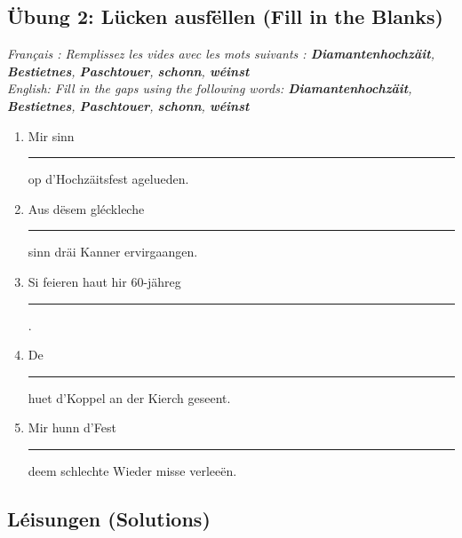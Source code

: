 \subsection*{Übung 2: Lücken ausfëllen (Fill in the Blanks)}
\textit{Français : Remplissez les vides avec les mots suivants : \textbf{Diamantenhochzäit}, \textbf{Bestietnes}, \textbf{Paschtouer}, \textbf{schonn}, \textbf{wéinst}}\\
\textit{English: Fill in the gaps using the following words: \textbf{Diamantenhochzäit}, \textbf{Bestietnes}, \textbf{Paschtouer}, \textbf{schonn}, \textbf{wéinst}}

\begin{enumerate}
    \item Mir sinn \rule{3cm}{0.4pt} op d'Hochzäitsfest agelueden.
    \item Aus dësem gléckleche \rule{3cm}{0.4pt} sinn dräi Kanner ervirgaangen.
    \item Si feieren haut hir 60-jähreg \rule{3cm}{0.4pt}.
    \item De \rule{3cm}{0.4pt} huet d'Koppel an der Kierch geseent.
    \item Mir hunn d'Fest \rule{3cm}{0.4pt} deem schlechte Wieder misse verleeën.
\end{enumerate}

\vspace{1.5em}

\subsection*{Léisungen (Solutions)}

